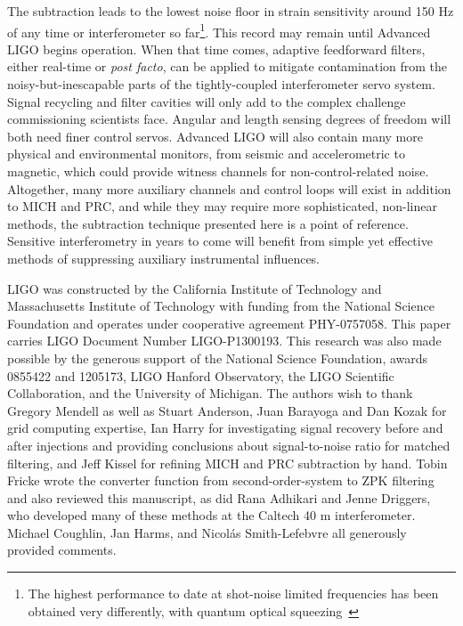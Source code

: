 The subtraction leads to the lowest noise floor in strain sensitivity around 150 Hz of any time or interferometer so far\footnote{The highest performance to date at shot-noise limited frequencies has been obtained very differently, with quantum optical squeezing~\cite{BarsottiNatureSqueezing,DwyerPhaseNoise}}. This record may remain until Advanced LIGO begins operation. When that time comes, adaptive feedforward filters, either real-time or \textit{post facto}, can be applied to mitigate contamination from the noisy-but-inescapable parts of the tightly-coupled interferometer servo system. Signal recycling and filter cavities will only add to the complex challenge commissioning scientists face. Angular and length sensing degrees of freedom will both need finer control servos. Advanced LIGO will also contain many more physical and environmental monitors, from seismic and accelerometric to magnetic, which could provide witness channels for non-control-related noise. Altogether, many more auxiliary channels and control loops will exist in addition to MICH and PRC, and while they may require more sophisticated, non-linear methods, the subtraction technique presented here is a point of reference. Sensitive interferometry in years to come will benefit from simple yet effective methods of suppressing auxiliary instrumental influences.

LIGO was constructed by the California Institute of Technology and Massachusetts Institute of Technology with funding from the National Science Foundation and operates under cooperative agreement PHY-0757058. This paper carries LIGO Document Number LIGO-P1300193. This research was also made possible by the generous support of the National Science Foundation, awards 0855422 and 1205173, LIGO Hanford Observatory, the LIGO Scientific Collaboration, and the University of Michigan. The authors wish to thank Gregory Mendell as well as Stuart Anderson, Juan Barayoga and Dan Kozak for grid computing expertise, Ian Harry for investigating signal recovery before and after injections and providing conclusions about signal-to-noise ratio for matched filtering, and Jeff Kissel for refining MICH and PRC subtraction by hand. Tobin Fricke wrote the converter function from second-order-system to ZPK filtering and also reviewed this manuscript, as did Rana Adhikari and Jenne Driggers, who developed many of these methods at the Caltech 40 m interferometer. Michael Coughlin, Jan Harms, and Nicol\'{a}s Smith-Lefebvre all generously provided comments.



%
%

%

